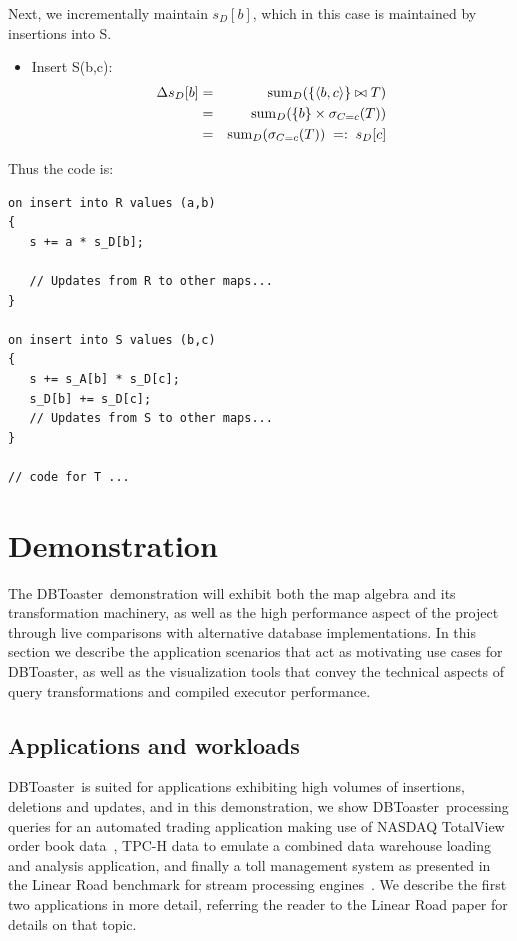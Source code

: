 \documentclass{vldb}
\newcommand{\tuple}[1]{{\langle#1\rangle}}
\newcommand{\compiler}{DBToaster}
\begin{document}
 
Next, we incrementally maintain $s_D[b]$, which in this case is maintained by
insertions into S.

\begin{itemize}
\item
Insert S(b,c):
\begin{eqnarray*}
\Delta s_D[b] &=&
\algsum_{D}(\{\tuple{b,c}\} \bowtie T)
\\ &=&
\algsum_{D}(\{b\} \times \sigma_{C=c}(T))
\\ &=&
\algsum_{D}(\sigma_{C=c}(T))
\;=:\; s_D[c]
\end{eqnarray*}
\end{itemize}

Thus the code is:
\begin{verbatim}
on insert into R values (a,b)
{
   s += a * s_D[b];

   // Updates from R to other maps...
}

on insert into S values (b,c)
{
   s += s_A[b] * s_D[c];
   s_D[b] += s_D[c];
   // Updates from S to other maps...
}

// code for T ...
\end{verbatim}



\section{Demonstration}
The \compiler\ demonstration will exhibit both the map algebra and its
transformation machinery, as well as the high performance aspect of the
project through live comparisons with alternative database implementations.
In this section we describe the application scenarios that act as motivating
use cases for \compiler, as well as the visualization tools that convey the
technical aspects of query transformations and compiled executor performance.

\subsection{Applications and workloads}
\compiler\ is suited for applications exhibiting high volumes of insertions,
deletions and updates, and in this demonstration, we show \compiler\ processing
queries for an automated trading application making use of NASDAQ TotalView order
book data~\cite{totalview-url}, TPC-H data to emulate a combined data warehouse
loading and analysis application, and finally a toll management system as
presented in the Linear Road benchmark for stream processing
engines~\cite{arasu-vldb:04}. We describe the first two applications in more
detail, referring the reader to the Linear Road paper for details on that topic.
\end{document}
